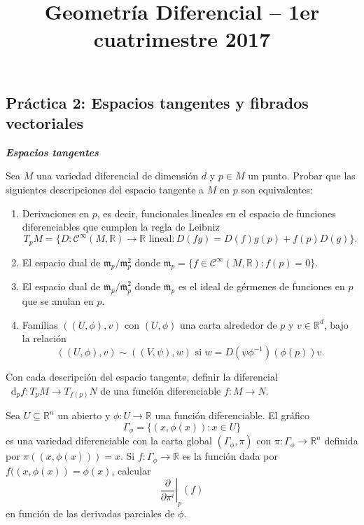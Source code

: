 \documentclass[12pt, a4paper]{amsart}
\theoremstyle{definition}
\newcommand{\RR}{\mathbb{R}}      %
\newcommand*\diff{\mathop{}\!\mathrm{d}}
\begin{document}
\title{Geometría Diferencial -- 1er cuatrimestre 2017}
\author{}
\date{}
\nocite{*}
\maketitle
\begin{center}
\section*{Práctica 2: Espacios tangentes y fibrados vectoriales}
\end{center}

\textsl{\textbf{Espacios tangentes}}
\vspace{1em}


\begin{question}
Sea $M$ una variedad diferencial de dimensión $d$ y $p\in M$ un punto. Probar que las siguientes descripciones del espacio tangente a $M$ en $p$ son equivalentes:
\begin{enumerate}[label=\textbf{\alph*.}]
\item Derivaciones en $p$, es decir, funcionales lineales en el espacio de funciones diferenciables que cumplen la regla de Leibniz $$T_pM=\{D:\mathscr{C}^\infty(M,\RR)\to\RR\text{ lineal}: D(fg)=D(f)g(p)+f(p)D(g)\}.$$ 
\item El espacio dual de $\mathfrak{m}_p/\mathfrak{m}_p^2$ donde $\mathfrak{m}_p=\{f\in\mathscr{C}^\infty(M,\RR):f(p)=0\}$.
\item El espacio dual de $\overline{\mathfrak{m}}_p/\overline{\mathfrak{m}}_p^2$ donde $\overline{\mathfrak{m}}_p$ es el ideal de gérmenes de funciones en $p$ que se anulan en $p$.
\item Familias $((U,\phi),v)$ con $(U,\phi)$ una carta alrededor de $p$ y $v\in\RR^d$, bajo la relación $$((U,\phi),v)\sim ((V,\psi),w) \text{ si }w = D(\psi\phi^{-1})(\phi(p))v.$$
\end{enumerate}
Con cada descripción del espacio tangente, definir la diferencial $\diff_pf:T_pM\to T_{f(p)}N$ de una función diferenciable $f:M\to N$.
\end{question}

\begin{question}
Sea $U\subseteq\RR^n$ un abierto y $\phi:U\to\RR$ una función diferenciable. El gráfico $$\Gamma_\phi=\{(x,\phi(x)):x\in U\}$$ es una variedad diferenciable con la carta global $(\Gamma_\phi,\pi)$ con $\pi:\Gamma_\phi\to\RR^n$ definida por $\pi((x,\phi(x)))=x$. Si $f:\Gamma_\phi\to\RR$ es la función dada por $f((x,\phi(x))=\phi(x)$, calcular $$\left.\dfrac{\partial}{\partial \pi^i}\right|_p (f)$$ en función de las derivadas parciales de $\phi$.
\end{question}
\end{document}
